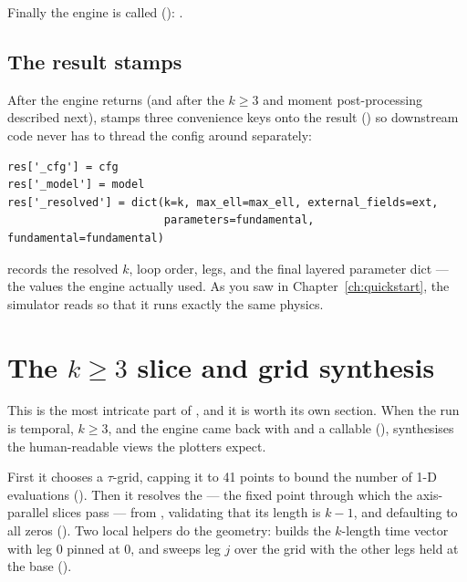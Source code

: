 Finally the engine is called ():
.

\subsection{The result stamps}

After the engine returns (and after the $k\ge 3$ and moment post-processing
described next),  stamps three convenience keys onto the result
() so downstream code never has to thread the
config around separately:

\begin{lstlisting}
res['_cfg'] = cfg
res['_model'] = model
res['_resolved'] = dict(k=k, max_ell=max_ell, external_fields=ext,
                        parameters=fundamental, fundamental=fundamental)
\end{lstlisting}

 records the resolved $k$, loop order, legs, and the final
layered parameter dict --- the values the engine actually used. As you saw in
Chapter~\ref{ch:quickstart}, the simulator reads
 so that it runs exactly the same physics.

\section{The \texorpdfstring{$k\ge 3$}{k>=3} slice and grid synthesis}\label{eng:kge3}

This is the most intricate part of , and it is worth its own section.
When the run is temporal, $k\ge 3$, and the engine came back with
 and a callable 
(),  synthesises the human-readable
views the plotters expect.

First it chooses a $\tau$-grid, capping it to 41 points to bound the number of
1-D evaluations (). Then it resolves the
 --- the fixed point through which the axis-parallel slices pass ---
from , validating that its length is $k-1$, and
defaulting to all zeros (). Two local helpers
do the geometry:  builds the $k$-length time vector with leg 0
pinned at 0, and  sweeps leg $j$ over the grid with the other
legs held at the base ().

